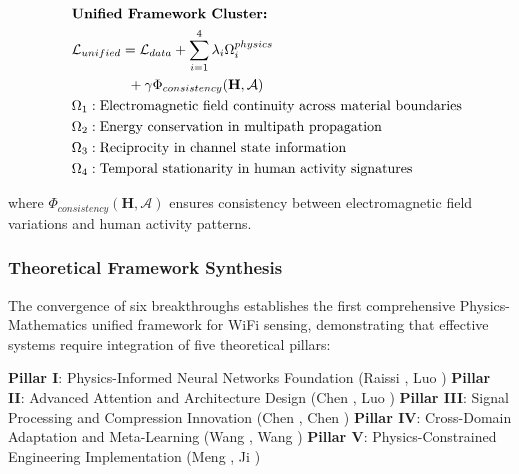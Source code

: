 \documentclass[journal]{IEEEtran}
\begin{document}
\begin{align}
&\hspace{2em} \text{\textbf{Unified Framework Cluster:}} \quad &  \nonumber \\
&\hspace{2em} \mathcal{L}_{unified} = \mathcal{L}_{data} + \sum_{i=1}^{4} \lambda_i \Omega_i^{physics} \quad &  \nonumber \\
&\hspace{6em} + \gamma \Phi_{consistency}(\mathbf{H}, \mathcal{A}) \label{eq:unified_framework_v4} \\
&\hspace{2em} \Omega_1 : \text{Electromagnetic field continuity across material boundaries} \label{eq:assumption1_v4} \\
&\hspace{2em} \Omega_2 : \text{Energy conservation in multipath propagation} \label{eq:assumption2_v4} \\
&\hspace{2em} \Omega_3 : \text{Reciprocity in channel state information} \label{eq:assumption3_v4} \\
&\hspace{2em} \Omega_4 : \text{Temporal stationarity in human activity signatures} \label{eq:assumption4_v4}
\end{align}

where $\Phi_{consistency}(\mathbf{H}, \mathcal{A})$ ensures consistency between electromagnetic field variations and human activity patterns.

\subsubsection{Theoretical Framework Synthesis}

The convergence of six breakthroughs establishes the first comprehensive Physics-Mathematics unified framework for WiFi sensing, demonstrating that effective systems require integration of five theoretical pillars:

\textbf{Pillar I}: Physics-Informed Neural Networks Foundation (Raissi \cite{raissi2019physics}, Luo \cite{luo2025physics})
\textbf{Pillar II}: Advanced Attention and Architecture Design (Chen \cite{chen2018wifi}, Luo \cite{luo2024vision})
\textbf{Pillar III}: Signal Processing and Compression Innovation (Chen \cite{chen2024efficientfi}, Chen \cite{chen2024wiphase})
\textbf{Pillar IV}: Cross-Domain Adaptation and Meta-Learning (Wang \cite{wang2022airfi}, Wang \cite{wang2024feature})
\textbf{Pillar V}: Physics-Constrained Engineering Implementation (Meng \cite{meng2021wihgr}, Ji \cite{ji2021clnet})
\end{document}

